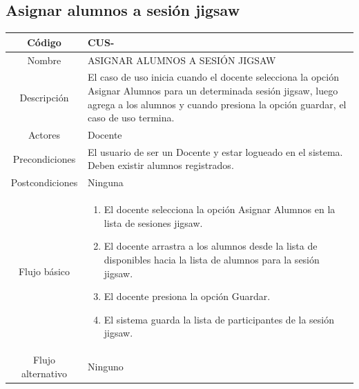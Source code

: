\subsection{Asignar alumnos a sesión jigsaw}
\begin{longtable}{|c|L{10cm}|}
	\hline
	Código &  CUS-\casodeuso\\  \hline
	Nombre &  ASIGNAR ALUMNOS A SESIÓN JIGSAW\\  \hline
	Descripción &  El caso de uso inicia cuando el docente selecciona la opción Asignar Alumnos para un determinada sesión jigsaw, luego agrega a los alumnos y cuando presiona la opción guardar, el caso de uso termina.\\  \hline
	Actores &  Docente\\  \hline
	Precondiciones &  El usuario de ser un Docente y estar logueado en el sistema. Deben existir alumnos registrados.\\  \hline
	Postcondiciones &  Ninguna\\  \hline
	Flujo básico &    \begin{enumerate}
		\item El docente selecciona la opción Asignar Alumnos en la lista de sesiones jigsaw.
		\item El docente arrastra a los alumnos desde la lista de disponibles hacia la lista de alumnos para la sesión jigsaw.
		\item El docente presiona la opción Guardar.
		\item El sistema guarda la lista de participantes de la sesión jigsaw.
	\end{enumerate}  \\ \hline
	Flujo alternativo & Ninguno \\  \hline
\end{longtable}
\clearpage
